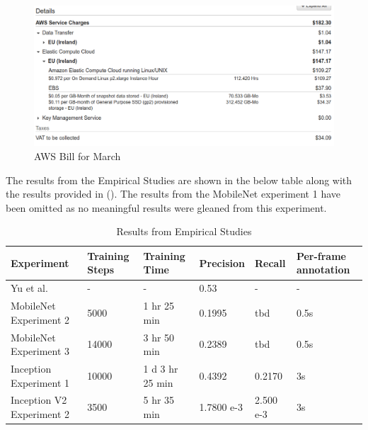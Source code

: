 \documentclass[12pt]{report}
\begin{document}
\vspace{0.5cm}
\begin{figure}[ht!]
	\centering
	\includegraphics[width=15cm]{bill}
	\caption{AWS Bill for March}
	\label{fig:bill}
\end{figure}

\begin{flushleft}
The results from the Empirical Studies are shown in the below table along with the results provided in (\cite{yu2018bdd100k}). The results from the MobileNet experiment 1 have been omitted as no meaningful results were gleaned from this experiment.
\end{flushleft}

\begin{table}[]
\begin{tabular}[ht]{|p{3cm}|p{2cm}|p{2cm}|p{2cm}|p{2cm}|p{2cm}|}
\hline
Experiment                & Training Steps & Training Time   & Precision  & Recall    & Per-frame annotation \\ \hline
Yu et al.                 & -              & -               & 0.53       & -         & -                    \\ \hline
MobileNet Experiment 2    & 5000           & 1 hr 25 min     & 0.1995     & tbd       & 0.5s                 \\ \hline
MobileNet Experiment 3    & 14000          & 3 hr 50 min     & 0.2389     & tbd       & 0.5s                 \\ \hline
Inception Experiment 1    & 10000          & 1 d 3 hr 25 min & 0.4392     & 0.2170    & 3s                   \\ \hline
Inception V2 Experiment 2 & 3500           & 5 hr 35 min     & 1.7800 e-3 & 2.500 e-3 & 3s                   \\ \hline
\end{tabular}
\caption{Results from Empirical Studies}
\end{table}
\end{document}
